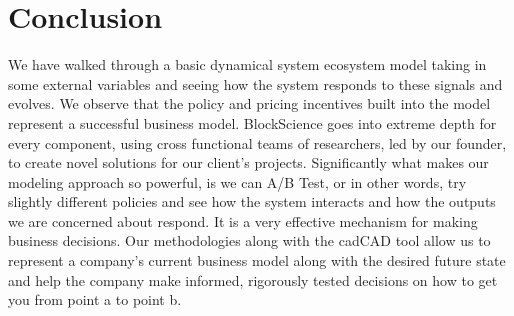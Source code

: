 \documentclass[12pt]{extarticle}
\begin{document}
\section{Conclusion}
We have walked through a basic dynamical system ecosystem model taking in some external variables and seeing how the system responds to these signals and evolves. We observe that the policy and pricing incentives built into the model represent a successful business model. BlockScience goes into extreme depth for every component, using cross functional teams of researchers, led by our founder, to create novel solutions for our client's projects. Significantly what makes our modeling approach so powerful, is we can A/B Test, or in other words, try slightly different policies and see how the system interacts and how the outputs we are concerned about respond. It is a very effective mechanism for making business decisions. Our methodologies along with the cadCAD tool allow us to represent a company’s current business model along with the desired future state and help the company make informed, rigorously tested decisions on how to get you from point a to point b.
\end{document}
